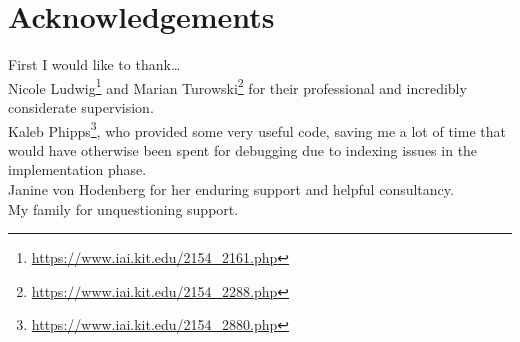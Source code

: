 \chapter*{Acknowledgements}

First I would like to thank\dots\\

Nicole Ludwig\footnote{\url{https://www.iai.kit.edu/2154_2161.php}} and Marian Turowski\footnote{\url{https://www.iai.kit.edu/2154_2288.php}} for their professional and incredibly considerate supervision.\\

Kaleb Phipps\footnote{\url{https://www.iai.kit.edu/2154_2880.php}}, who provided some very useful code, saving me a lot of time that would have otherwise been spent for debugging due to indexing issues in the implementation phase.\\

Janine von Hodenberg for her enduring support and helpful consultancy.\\

My family for unquestioning support.\\
